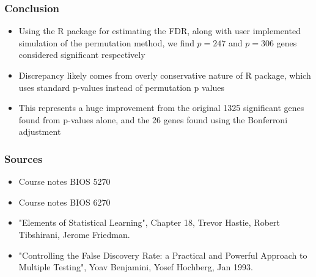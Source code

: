 \documentclass[11pt]{beamer}
\begin{document}
\begin{frame}
\frametitle{Conclusion}
{
\begin{itemize}
\item Using the R package for estimating the FDR, along with user implemented simulation of the permutation method, we find $p = 247$ and $p = 306$ genes considered significant respectively
\item Discrepancy likely comes from overly conservative nature of R package, which uses standard p-values instead of permutation p values \\
\item This represents a huge improvement from the original 1325 significant genes found from p-values alone, and the 26 genes found using the Bonferroni adjustment
\end{itemize}
}
\end{frame}

\begin{frame}
\frametitle{Sources}
{
\begin{itemize}
\item Course notes BIOS 5270 \\
\item Course notes BIOS 6270 \\
\item "Elements of Statistical Learning", Chapter 18, Trevor Hastie, Robert Tibshirani, Jerome Friedman. \\
\item "Controlling the False Discovery Rate: a Practical and Powerful Approach to Multiple Testing", Yoav Benjamini, Yosef Hochberg, Jan 1993.
\end{itemize}
}
\end{frame}
\end{document}
